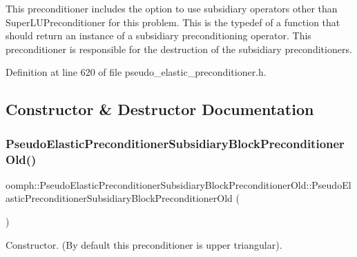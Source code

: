 This preconditioner includes the option to use subsidiary operators other than Super\+L\+U\+Preconditioner for this problem. This is the typedef of a function that should return an instance of a subsidiary preconditioning operator. This preconditioner is responsible for the destruction of the subsidiary preconditioners. 



Definition at line 620 of file pseudo\+\_\+elastic\+\_\+preconditioner.\+h.



\subsection{Constructor \& Destructor Documentation}
\mbox{\label{classoomph_1_1PseudoElasticPreconditionerSubsidiaryBlockPreconditionerOld_a270a6c5fc522dc82196e89bc6ece086d}} 
\subsubsection{\texorpdfstring{Pseudo\+Elastic\+Preconditioner\+Subsidiary\+Block\+Preconditioner\+Old()}{PseudoElasticPreconditionerSubsidiaryBlockPreconditionerOld()}\hspace{0.1cm}{\footnotesize\ttfamily [1/2]}}
{\footnotesize\ttfamily oomph\+::\+Pseudo\+Elastic\+Preconditioner\+Subsidiary\+Block\+Preconditioner\+Old\+::\+Pseudo\+Elastic\+Preconditioner\+Subsidiary\+Block\+Preconditioner\+Old (\begin{DoxyParamCaption}{ }\end{DoxyParamCaption})\hspace{0.3cm}{\ttfamily [inline]}}



Constructor. (By default this preconditioner is upper triangular). 



